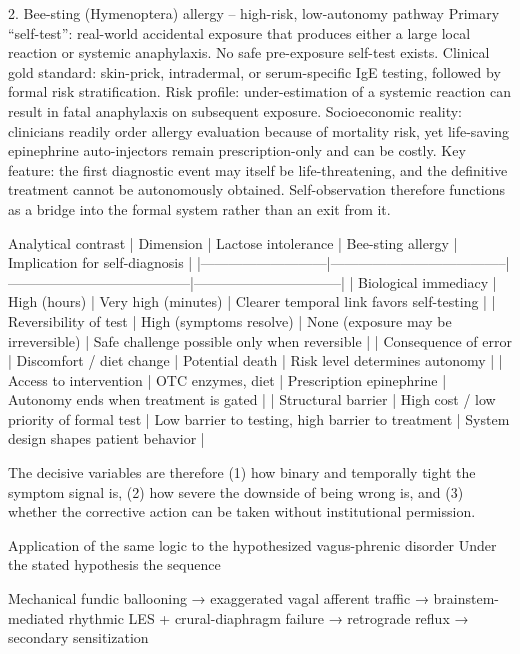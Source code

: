 2. Bee-sting (Hymenoptera) allergy – high-risk, low-autonomy pathway  
Primary “self-test”: real-world accidental exposure that produces either a large local reaction or systemic anaphylaxis. No safe pre-exposure self-test exists.  
Clinical gold standard: skin-prick, intradermal, or serum-specific IgE testing, followed by formal risk stratification.  
Risk profile: under-estimation of a systemic reaction can result in fatal anaphylaxis on subsequent exposure.  
Socioeconomic reality: clinicians readily order allergy evaluation because of mortality risk, yet life-saving epinephrine auto-injectors remain prescription-only and can be costly.  
Key feature: the first diagnostic event may itself be life-threatening, and the definitive treatment cannot be autonomously obtained. Self-observation therefore functions as a bridge into the formal system rather than an exit from it.

Analytical contrast
| Dimension                  | Lactose intolerance                  | Bee-sting allergy                     | Implication for self-diagnosis |
|---------------------------|--------------------------------------|---------------------------------------|--------------------------------|
| Biological immediacy      | High (hours)                        | Very high (minutes)                  | Clearer temporal link favors self-testing |
| Reversibility of test     | High (symptoms resolve)             | None (exposure may be irreversible)  | Safe challenge possible only when reversible |
| Consequence of error      | Discomfort / diet change            | Potential death                      | Risk level determines autonomy |
| Access to intervention    | OTC enzymes, diet                   | Prescription epinephrine             | Autonomy ends when treatment is gated |
| Structural barrier        | High cost / low priority of formal test | Low barrier to testing, high barrier to treatment | System design shapes patient behavior |

The decisive variables are therefore (1) how binary and temporally tight the symptom signal is, (2) how severe the downside of being wrong is, and (3) whether the corrective action can be taken without institutional permission.

Application of the same logic to the hypothesized vagus-phrenic disorder
Under the stated hypothesis the sequence  

Mechanical fundic ballooning → exaggerated vagal afferent traffic → brainstem-mediated rhythmic LES + crural-diaphragm failure → retrograde reflux → secondary sensitization  

